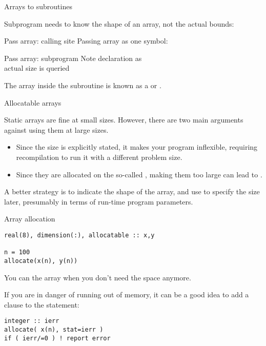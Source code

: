  {Arrays to subroutines}

Subprogram needs to know the shape of an array, not the actual bounds:

\begin{block}{Pass array: calling site}
  \label{sl:farray-pass1d-main}
  Passing array as one symbol:
\end{block}

\begin{block}{Pass array: subprogram}
  \label{sl:farray-pass1d-subr}
  Note declaration as \\
  actual size is queried
\end{block}

The array inside the subroutine is known as a
 or
.

 {Allocatable arrays}
\label{sec:allocatable}

Static arrays are fine at small sizes. However, 
there are two main arguments against using them at large sizes.
\begin{itemize}
\item Since the size is explicitly stated, it makes your program
  inflexible, requiring recompilation to run it with a different
  problem size.
\item Since they are allocated on the so-called ,
  making them too large can lead to .
\end{itemize}

A better strategy is to indicate the shape of the array, and use
 to specify
the size later, presumably in terms of run-time program parameters.

\begin{block}{Array allocation}
  \label{sl:farray-alloc}
\begin{lstlisting}
real(8), dimension(:), allocatable :: x,y

n = 100
allocate(x(n), y(n))
\end{lstlisting}
You can  the array when you don't need the
space anymore.
\end{block}

If you are in danger of running out of memory, it can be a good idea
to add a  clause to the  statement:
\begin{lstlisting}
integer :: ierr
allocate( x(n), stat=ierr )
if ( ierr/=0 ) ! report error
\end{lstlisting}

